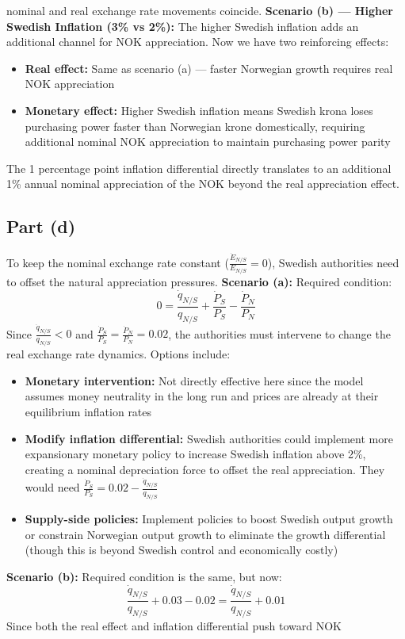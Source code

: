 nominal and real exchange rate movements coincide. \textbf{Scenario (b) ---
Higher Swedish Inflation (3\% vs 2\%):} The higher Swedish inflation adds an
additional channel for NOK appreciation. Now we have two reinforcing effects:
\begin{itemize} \item \textbf{Real effect:} Same as scenario (a) --- faster
Norwegian growth requires real NOK appreciation \item \textbf{Monetary effect:}
Higher Swedish inflation means Swedish krona loses purchasing power faster than
Norwegian krone domestically, requiring additional nominal NOK appreciation to
maintain purchasing power parity \end{itemize} The 1 percentage point inflation
differential directly translates to an additional 1\% annual nominal
appreciation of the NOK beyond the real appreciation effect. \subsection{Part
(d)} To keep the nominal exchange rate constant ($\frac{\dot{E}_{N/S}}{E_{N/S}}
= 0$), Swedish authorities need to offset the natural appreciation pressures.
\textbf{Scenario (a):} Required condition: \[ 0 = \frac{\dot{q}_{N/S}}{q_{N/S}}
+ \frac{\dot{P}_S}{P_S} - \frac{\dot{P}_N}{P_N} \] Since
$\frac{\dot{q}_{N/S}}{q_{N/S}} < 0$ and $\frac{\dot{P}_S}{P_S} =
\frac{\dot{P}_N}{P_N} = 0.02$, the authorities must intervene to change the real
exchange rate dynamics. Options include: \begin{itemize} \item \textbf{Monetary
intervention:} Not directly effective here since the model assumes money
neutrality in the long run and prices are already at their equilibrium inflation
rates \item \textbf{Modify inflation differential:} Swedish authorities could
implement more expansionary monetary policy to increase Swedish inflation above
2\%, creating a nominal depreciation force to offset the real appreciation. They
would need $\frac{\dot{P}_S}{P_S} = 0.02 - \frac{\dot{q}_{N/S}}{q_{N/S}}$ \item
\textbf{Supply-side policies:} Implement policies to boost Swedish output growth
or constrain Norwegian output growth to eliminate the growth differential
(though this is beyond Swedish control and economically costly) \end{itemize}
\textbf{Scenario (b):} Required condition is the same, but now: \[
\frac{\dot{q}_{N/S}}{q_{N/S}} + 0.03 - 0.02 = \frac{\dot{q}_{N/S}}{q_{N/S}} +
0.01 \] Since both the real effect and inflation differential push toward NOK

